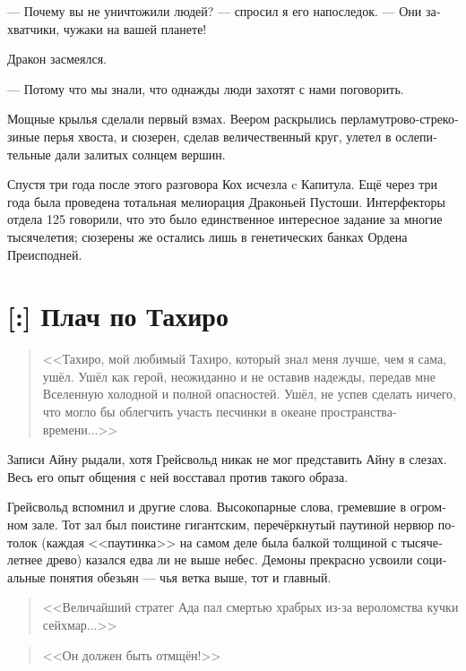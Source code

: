 \documentclass[a4paper,12pt,fleqn]{book}\usepackage{cooltooltips}\usepackage{polyglossia}\setdefaultlanguage[babelshorthands=true]{russian}\setotherlanguage{english}\defaultfontfeatures{Ligatures=TeX,Mapping=tex-text} \usepackage{xcolor}\definecolor{lightgray}{HTML}{bbbbbb}\color{lightgray}\newcommand{\ml}[3]{\textenglish{\textcolor{black}{#3}}}
\newcommand{\asterism}{\vspace{1em}{\centering\Large\bfseries$\ast~\ast~\ast$\par}\vspace{1em}}
\newcommand{\textspace}{\vspace{1em}{\centering\Large\bfseries<...>\par}\vspace{1em}}
\begin{document}
--- Почему вы не уничтожили людей? --- спросил я его напоследок.
--- Они захватчики, чужаки на вашей планете!

Дракон засмеялся.

--- Потому что мы знали, что однажды люди захотят с нами поговорить.

Мощные крылья сделали первый взмах.
Веером раскрылись перламутрово-стрекозиные перья хвоста, и сюзерен, сделав величественный круг, улетел в ослепительные дали залитых солнцем вершин.

\asterism

Спустя три года после этого разговора Кох исчезла c Капитула.
Ещё через три года была проведена тотальная мелиорация Драконьей Пустоши.
Интерфекторы отдела 125 говорили, что это было единственное интересное задание за многие тысячелетия;
сюзерены же остались лишь в генетических банках Ордена Преисподней.

\section{[:] Плач по Тахиро}

\textspace

\begin{quote}
<<Тахиро, мой любимый Тахиро, который знал меня лучше, чем я сама, ушёл.
Ушёл как герой, неожиданно и не оставив надежды, передав мне Вселенную холодной и полной опасностей.
Ушёл, не успев сделать ничего, что могло бы облегчить участь песчинки в океане пространства-времени...>>
\end{quote}

Записи Айну рыдали, хотя Грейсвольд никак не мог представить Айну в слезах.
Весь его опыт общения с ней восставал против такого образа.

Грейсвольд вспомнил и другие слова.
Высокопарные слова, гремевшие в огромном зале.
Тот зал был поистине гигантским, перечёркнутый паутиной нервюр потолок (каждая <<паутинка>> на самом деле была балкой толщиной с тысячелетнее древо) казался едва ли не выше небес.
Демоны прекрасно усвоили социальные понятия обезьян --- чья ветка выше, тот и главный.

\begin{quote}
<<Величайший стратег Ада пал смертью храбрых из-за вероломства кучки сейхмар...>>
\end{quote}

\begin{quote}
<<Он должен быть отмщён!>>
\end{quote}
\end{document}
